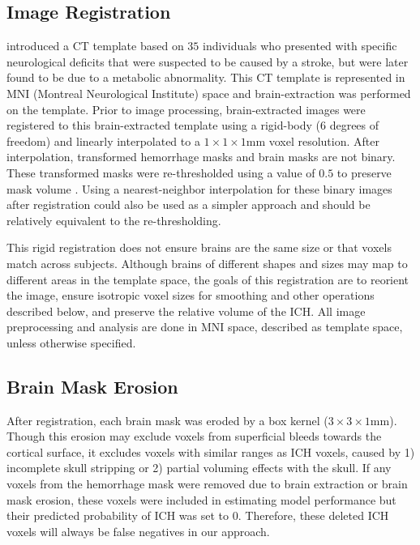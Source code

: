 \documentclass{elsarticle_nonatbib}\usepackage[]{graphicx}\usepackage[]{color}
\begin{document}
\subsection{Image Registration}
\citet{rorden_age-specific_2012} introduced a CT template based on $35$ individuals who presented with specific neurological deficits that were suspected to be caused by a stroke, but were later found to be due to a metabolic abnormality.  This CT template is represented in MNI (Montreal Neurological Institute) space and brain-extraction was performed on the template.  Prior to image processing, brain-extracted images were registered to this brain-extracted template using a rigid-body (6 degrees of freedom) and linearly interpolated to a $1\times1\times1$mm voxel resolution.  After interpolation, transformed hemorrhage masks and brain masks are not binary.  These transformed masks were re-thresholded using a value of $0.5$ to preserve mask volume \cite{flirt_reg}.  Using a nearest-neighbor interpolation for these binary images after registration could also be used as a simpler approach and should be relatively equivalent to the re-thresholding.

This rigid registration does not ensure brains are the same size or that voxels match across subjects.  Although brains of different shapes and sizes may map to different areas in the template space, the goals of this registration are to reorient the image, ensure isotropic voxel sizes for smoothing and other operations described below, and preserve the relative volume of the ICH.  All image preprocessing and analysis are done in MNI space, described as template space, unless otherwise specified.


\subsection{Brain Mask Erosion}
After registration, each brain mask was eroded by a box kernel ($3\times3\times1$mm).  Though this erosion may exclude voxels from superficial bleeds towards the cortical surface, it excludes voxels with similar ranges as ICH voxels, caused by 1) incomplete skull stripping or 2) partial voluming effects with the skull.  If any voxels from the hemorrhage mask were removed due to brain extraction or brain mask erosion, these voxels were included in estimating model performance but their predicted probability of ICH was set to $0$.  Therefore, these deleted ICH voxels will always be false negatives in our approach.

\end{document}
